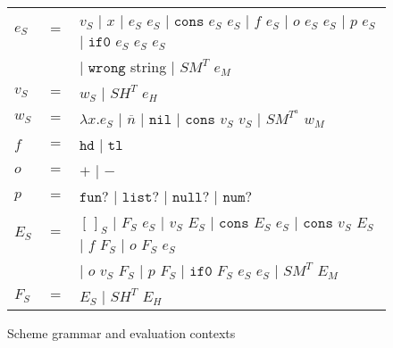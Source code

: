 \begin{figure}[p]
\centering
\begin{tabular}{lcl}
$e_{S}$ & $=$ & $v_{S}$ $\vert$ $x$ $\vert$ $e_{S}$ $e_{S}$ $\vert$ $\mathtt{cons}$ $e_{S}$ $e_{S}$ $\vert$ $f$ $e_{S}$ $\vert$ $o$ $e_{S}$ $e_{S}$ $\vert$ $p$ $e_{S}$ $\vert$ $\mathtt{if0}$ $e_{S}$ $e_{S}$ $e_{S}$ \\
&& $\vert$ $\mathtt{wrong}$ string $\vert$ $SM^{T}$ $e_{M}$ \\
$v_{S}$ & $=$ & $w_{S}$ $\vert$ $SH^{T}$ $e_{H}$ \\
$w_{S}$ & $=$ & $\lambda x.e_{S}$ $\vert$ $\overline{n}$ $\vert$ $\mathtt{nil}$ $\vert$ $\mathtt{cons}$ $v_{S}$ $v_{S}$ $\vert$ $SM^{T^{a}}$ $w_{M}$ \\
$f$ & $=$ & $\mathtt{hd}$ $\vert$ $\mathtt{tl}$ \\
$o$ & $=$ & $+$ $\vert$ $-$ \\
$p$ & $=$ & $\mathtt{fun?}$ $\vert$ $\mathtt{list?}$ $\vert$ $\mathtt{null?}$ $\vert$ $\mathtt{num?}$ \\
$E_{S}$ & $=$ & $[\,]_{S}$ $\vert$ $F_{S}$ $e_{S}$ $\vert$ $v_{S}$ $E_{S}$ $\vert$ $\mathtt{cons}$ $E_{S}$ $e_{S}$ $\vert$ $\mathtt{cons}$ $v_{S}$ $E_{S}$ $\vert$ $f$ $F_{S}$ $\vert$ $o$ $F_{S}$ $e_{S}$ \\
&& $\vert$ $o$ $v_{S}$ $F_{S}$ $\vert$ $p$ $F_{S}$ $\vert$ $\mathtt{if0}$ $F_{S}$ $e_{S}$ $e_{S}$ $\vert$ $SM^{T}$ $E_{M}$ \\
$F_{S}$ & $=$ & $E_{S}$ $\vert$ $SH^{T}$ $E_{H}$
\end{tabular}
\caption{Scheme grammar and evaluation contexts}
\label{sg}
\end{figure}
